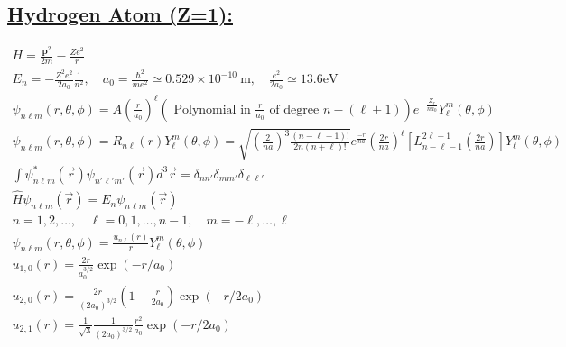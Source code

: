 \documentclass[a4paper,12pt]{article}
\begin{document}
\subsection*{\underline{Hydrogen Atom (Z=1):}}
\begin{gather}
    H=\frac{\mathbf{p}^{2}}{2 m}-\frac{Z e^{2}}{r} \\
    E_{n}=-\frac{Z^{2} e^{2}}{2 a_{0}} \frac{1}{n^{2}}, \quad a_{0}=\frac{\hbar^{2}}{m e^{2}} \simeq 0.529 \times 10^{-10} \mathrm{~m}, \quad \frac{e^{2}}{2 a_{0}} \simeq 13.6 \mathrm{eV} \\
    \psi_{n \ell m}(r, \theta,\phi)=A\left(\frac{r}{a_{0}}\right)^{\ell}\left(\text { Polynomial in } \frac{r}{a_{0}} \text { of degree } n-(\ell+1)\right) e^{-\frac{Z_{r}}{n a_{0}}} {Y_{\ell}^m}(\theta, \phi) \\
    \psi_{n\ell m}(r, \theta, \phi) = R_{n \ell}(r){Y_{\ell}^m}(\theta, \phi)= \sqrt{\left(\frac{2}{na}\right)^3\frac{\left(n-\ell-1\right)!}{2n(n+\ell)!}}e^{\frac{-r}{na}}\left(\frac{2r}{na}\right)^\ell [L_{n-\ell-1}^{2\ell+1}\left(\frac{2r}{na}\right)]{Y_{\ell}^m}(\theta, \phi)\\
    \int\psi^*_{n \ell m}(\vec{r})\psi_{n' \ell ' m'}(\vec{r})d^3\vec r=\delta_{nn'}\delta_{mm'}\delta_{\ell\ell '}\\
    \hat{H}\psi_{n \ell m}(\vec{r}) = E_n\psi_{n \ell m}(\vec{r})\\
    n=1,2, \ldots, \quad \ell=0,1, \ldots, n-1, \quad m=-\ell, \ldots, \ell \\
   \psi_{n\ell m}(r, \theta, \phi)=\frac{u_{n \ell}(r)}{r} {Y_{\ell}^m}(\theta, \phi) \\
    u_{1,0}(r)=\frac{2 r}{a_{0}^{3 / 2}} \exp \left(-r / a_{0}\right) \\
    u_{2,0}(r)=\frac{2 r}{\left(2 a_{0}\right)^{3 / 2}}\left(1-\frac{r}{2 a_{0}}\right) \exp \left(-r / 2 a_{0}\right) \\
    u_{2,1}(r)=\frac{1}{\sqrt{3}} \frac{1}{\left(2 a_{0}\right)^{3 / 2}} \frac{r^{2}}{a_{0}} \exp \left(-r / 2 a_{0}\right)
\end{gather}
\end{document}

